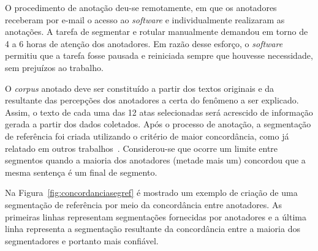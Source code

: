 O procedimento de anotação deu-se remotamente, em que os anotadores receberam por e-mail o acesso ao \textit{software} e individualmente realizaram as anotações. A tarefa de segmentar e rotular manualmente demandou em torno de 4 a 6 horas de atenção dos anotadores. Em razão desse esforço, o \textit{software} permitiu que a tarefa fosse pausada e reiniciada sempre que houvesse necessidade, sem prejuízos ao trabalho.



O \textit{corpus} anotado deve ser constituído a partir dos textos originais e da resultante das percepções dos anotadores a certa do fenômeno a ser explicado. Assim, o texto de cada uma das 12 atas selecionadas será acrescido de informação gerada a partir dos dados coletados. Após o processo de anotação, a segmentação de referência foi criada utilizando o critério de maior concordância, como já relatado em outros trabalhos~\cite{Hearst1997, Cardoso2017, Kazantseva2012, Passonneau1997, Galley2003}. Considerou-se que ocorre um limite entre segmentos quando a maioria dos anotadores (metade mais um) concordou que a mesma sentença é um final de segmento. 

Na Figura~\ref{fig:concordanciasegref} é mostrado um exemplo de criação de uma segmentação de referência por meio da concordância entre anotadores. As primeiras linhas representam segmentações fornecidas por anotadores e a última linha representa a segmentação resultante da concordância entre a maioria dos segmentadores e portanto mais confiável. 

